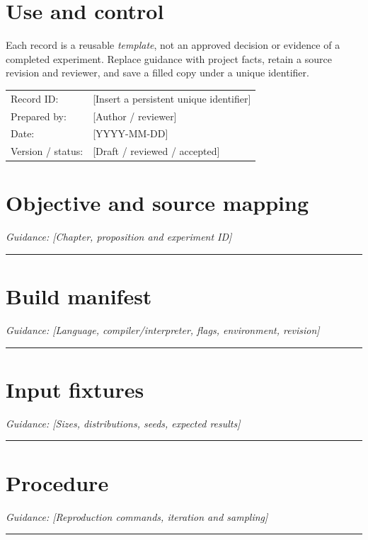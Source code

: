 \documentclass[11pt]{article}
\begin{document}
\makedoctitle
\section{Use and control}
Each record is a reusable \emph{template}, not an approved decision or evidence of a completed experiment. Replace guidance with project facts, retain a source revision and reviewer, and save a filled copy under a unique identifier.\par\medskip
\begin{tabularx}{\linewidth}{@{}lX@{}}Record ID: & [Insert a persistent unique identifier] \\ Prepared by: & [Author / reviewer] \\ Date: & [YYYY-MM-DD] \\ Version / status: & [Draft / reviewed / accepted] \\\end{tabularx}
\section{Objective and source mapping}
\noindent\textit{Guidance: [Chapter, proposition and experiment ID]}\par\vspace{0.9cm}\hrule\vspace{0.25cm}
\section{Build manifest}
\noindent\textit{Guidance: [Language, compiler/interpreter, flags, environment, revision]}\par\vspace{0.9cm}\hrule\vspace{0.25cm}
\section{Input fixtures}
\noindent\textit{Guidance: [Sizes, distributions, seeds, expected results]}\par\vspace{0.9cm}\hrule\vspace{0.25cm}
\section{Procedure}
\noindent\textit{Guidance: [Reproduction commands, iteration and sampling]}\par\vspace{0.9cm}\hrule\vspace{0.25cm}
\end{document}
